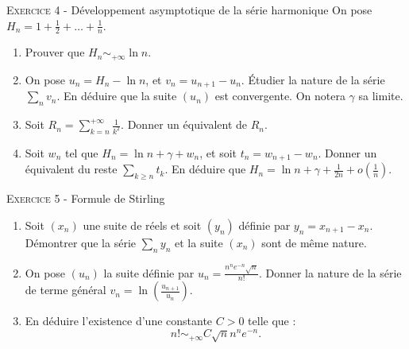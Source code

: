 \documentclass[11pt]{article}
\newcommand{\dis}{\displaystyle}
\begin{document}


\vskip0.3cm\noindent\textsc{Exercice 4} - Développement asymptotique de la série harmonique
\vskip0.2cm
On pose $H_n=1+\frac12+\dots+\frac1n$. 
\begin{enumerate}
\item Prouver que $H_n\sim_{+\infty}\ln n$.
\item On pose $u_n=H_n-\ln n$, et $v_n=u_{n+1}-u_n$.
\'Etudier la nature de la série $\sum_n v_n$. En déduire que la suite $(u_n)$ est convergente. On notera $\gamma$ sa limite.
\item Soit $R_n=\sum_{k=n}^{+\infty} \frac{1}{k^2}$. Donner un équivalent de $R_n$.
\item Soit $w_n$ tel que $H_n=\ln n+\gamma+w_n$, et soit 
$t_n=w_{n+1}-w_n$. Donner un équivalent du reste $\sum_{k\geq n}t_k$.
En déduire que $H_n=\ln n+\gamma+\frac{1}{2n}+o\left(\frac1n\right)$.
\end{enumerate}




\vskip0.3cm\noindent\textsc{Exercice 5} - Formule de Stirling
\vskip0.2cm
\begin{enumerate}
\item Soit $(x_n)$ une suite de réels et soit $(y_n)$ définie par $y_n=x_{n+1}-x_n$. Démontrer que la série $\sum_n y_n$ et la suite
$(x_n)$ sont de même nature.
\item On pose  $(u_n)$ la suite définie par $\dis u_n=\frac{n^ne^{-n}\sqrt{n}}{n!}$. 
Donner la nature de la série de terme général $\dis v_n=\ln\left(\frac{u_{n+1}}{u_n}\right)$. 
\item En déduire l'existence d'une constante $C>0$ telle que :
$$n!\sim_{+\infty} C\sqrt{n}n^ne^{-n}.$$
\end{enumerate}




\vskip0.5cm

\end{document}
